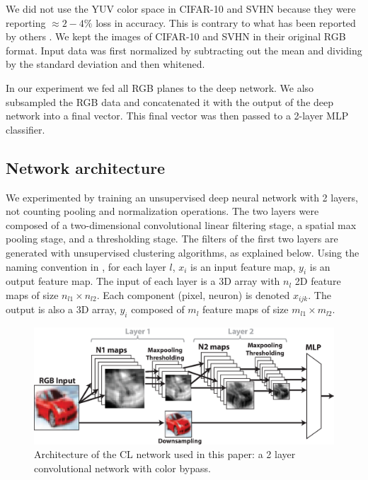 \documentclass{article} %
\begin{document}
We did not use the YUV color space in CIFAR-10 and SVHN because they were reporting $\approx 2-4\%$ loss in accuracy.
This is contrary to what has been reported by others \cite{jarrett_what_2009}.
We kept the images of CIFAR-10 and SVHN in their original RGB format.
Input data was first normalized by subtracting out the mean and dividing by the standard deviation and then whitened.

In our experiment we fed all RGB planes to the deep network.
We also subsampled the RGB data and concatenated it with the output of the deep network into a final vector.
This final vector was then passed to a 2-layer MLP classifier.

\subsection{Network architecture}
\label{sec-net-arch}

We experimented by training an unsupervised deep neural network with 2 layers, not counting pooling and normalization operations.
The two layers were composed of a two-dimensional convolutional linear filtering stage, a spatial max pooling stage, and a thresholding stage. 
The filters of the first two layers are generated with unsupervised clustering algorithms, as explained below. 
Using the naming convention in \cite{lecun_convolutional_2010}, for each layer $l$, $x_i$ is an input feature map, $y_i$ is an output feature map.
The input of each layer is a 3D array with $n_l$ 2D feature maps of size $n_{l1} \times n_{l2}$.
Each component (pixel, neuron) is denoted $x_{ijk}$.
The output is also a 3D array, $y_i$ composed of $m_l$ feature maps of size $m_{l1} \times m_{l2}$.


\begin{figure}
\includegraphics[width=5in]{overall-structure.eps}
\caption{Architecture of the CL network used in this paper: a 2 layer convolutional network with color bypass.}
\label{fig-netarch}
\end{figure}
\end{document}
